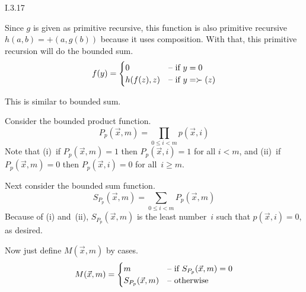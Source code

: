 \begin{ans}{I.3.17}
\begin{exparts}
\item Since $g$ is given as primitive recursive,
this function is also primitive recursive
$h(a,b)=\plus(a,g(b))$ because it uses composition.
With that, this primitive recursion will do the bounded sum.
\begin{equation*}
  f(y)=
    \begin{cases}
      0          &\text{-- \text{if $y=0$}}  \\
      h(f(z),z)  &\text{-- \text{if $y=\succ(z)$}}
    \end{cases}
\end{equation*}

\item
This is similar to bounded sum.

\item
Consider the bounded product function.
\begin{equation*}
  P_p(\vec{x},m)=\prod_{0\leq i<m} p(\vec{x},i)
\end{equation*}
Note that (i)~if $P_p(\vec{x},m)=1$ then $P_p(\vec{x},i)=1$ for all $i<m$,
and (ii)~if $P_p(\vec{x},m)=0$ then $P_p(\vec{x},i)=0$ for all~$i\geq m$.

Next consider the bounded sum function.
\begin{equation*}
  S_{P_p}(\vec{x},m)=\sum_{0\leq i<m} P_p(\vec{x},m)
\end{equation*}
Because of (i) and~(ii), $S_{P_p}(\vec{x},m)$ is the least number~$i$ such that
$p(\vec{x},i)=0$, as desired.

Now just define $M(\vec{x},m)$ by cases.
\begin{equation*}
  M(\vec{x},m)=
  \begin{cases}
    m     &\text{-- \text{if $S_{P_p}(\vec{x},m)=0$}} \\
    S_{P_p}(\vec{x},m)  &\text{-- \text{otherwise}}
  \end{cases}
\end{equation*}
\end{exparts}
\end{ans}
%
